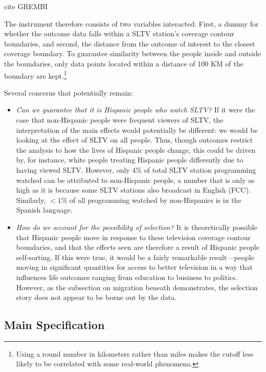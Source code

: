 \documentclass[11pt]{article}
\begin{document}
cite GREMBI 

The instrument therefore consists of two variables interacted: First, a dummy for whether the outcome data falls within a SLTV station's coverage contour boundaries, and second, the distance from the outcome of interest to the closest coverage boundary. To guarantee similarity between the people inside and outside the boundaries, only data points located within a distance of 100 KM of the boundary are kept.\footnote{ Using a round number in kilometers rather than miles makes the cutoff less likely to be correlated with some real-world phenomena.} 

Several concerns that potentially remain:
\begin{itemize}
\item \textit{Can we guarantee that it is Hispanic people who watch SLTV?} If it were the case that non-Hispanic people were frequent viewers of SLTV, the interpretation of the main effects would potentially be different: we would be looking at the effect of SLTV on all people. Thus, though outcomes restrict the analysis to how the lives of Hispanic people change, this could be driven by, for instance, white people treating Hispanic people differently due to having viewed SLTV. However, only 4\% of total SLTV station programming watched can be attributed to non-Hispanic people, a number that is only as high as it is because some SLTV stations also broadcast in English  (FCC\cite{noauthor_hispanic_2016}). Similarly, $<1\%$ of all programming watched by non-Hispanics is in the Spanish language.

\item \textit{How do we account for the possibility of selection?} It is theoretically possible that Hispanic people move in response to these television coverage contour boundaries, and that the effects seen are therefore a result of Hispanic people self-sorting. If this were true, it would be a fairly remarkable result---people moving in significant quantities for access to better television in a way that influences life outcomes ranging from education to business to politics. However, as the subsection on migration beneath demonstrates, the selection story does not appear to be borne out by the data.
\end{itemize}

\subsection{Main Specification}
\end{document}

